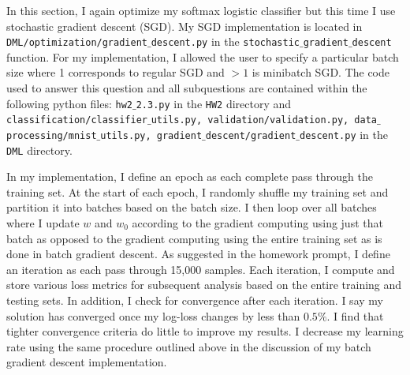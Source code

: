 \documentclass[12pt]{amsart}
\begin{document}
In this section, I again optimize my softmax logistic classifier but this time I use stochastic gradient descent (SGD).  My SGD implementation is located in {\tt DML/optimization/gradient$\_$descent.py} in the {\tt stochastic$\_$gradient$\_$descent} function.  For my implementation, I allowed the user to specify a particular batch size where 1 corresponds to regular SGD and $> 1$ is minibatch SGD.  The code used to answer this question and all subquestions are contained within the following python files: {\tt hw2$\_$2.3.py} in the {\tt HW2} directory and {\tt classification/classifier$\_$utils.py, validation/validation.py, data$\_$processing/mnist$\_$utils.py, gradient$\_$descent/gradient$\_$descent.py} in the {\tt DML} directory.

In my implementation, I define an epoch as each complete pass through the training set.  At the start of each epoch, I randomly shuffle my training set and partition it into batches based on the batch size.  I then loop over all batches where I update $w$ and $w_0$ according to the gradient computing using just that batch as opposed to the gradient computing using the entire training set as is done in batch gradient descent.  As suggested in the homework prompt, I define an iteration as each pass through 15,000 samples.  Each iteration, I compute and store various loss metrics for subsequent analysis based on the entire training and testing sets.  In addition, I check for convergence after each iteration.  I say my solution has converged once my log-loss changes by less than $0.5\%$.  I find that tighter convergence criteria do little to improve my results.  I decrease my learning rate using the same procedure outlined above in the discussion of my batch gradient descent implementation.
\end{document}
